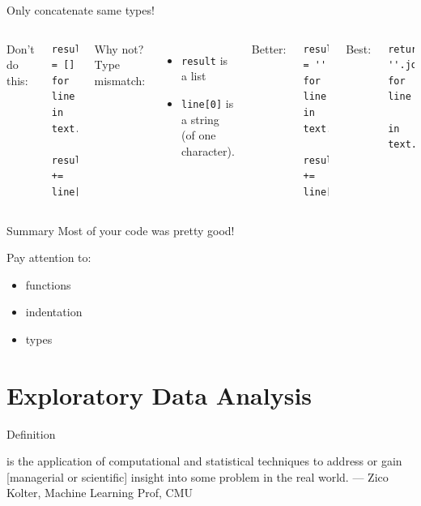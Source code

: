 \documentclass{beamer}
\begin{document}
\begin{frame}[fragile]{Only concatenate same types!}
\begin{columns}[T]
Don't do this:
\begin{lstlisting}
result = []
for line in text.splitlines():
    result += line[0]
\end{lstlisting}
Why not? Type mismatch:
    \begin{itemize}
        \item \texttt{result} is a list
        \item \texttt{line[0]} is a string \\
            (of one character).
    \end{itemize}
\pause{}
Better:
\begin{lstlisting}
result = ''
for line in text.splitlines():
    result += line[0]
\end{lstlisting}
Best:
\begin{lstlisting}
return ''.join(line[0] for line
        in text.splitlines())
\end{lstlisting}
\end{columns}
\end{frame}


\begin{frame}{Summary}
    Most of your code was pretty good!
    
    \vspace{1em}
    Pay attention to:
    \begin{itemize}
        \item functions
        \item indentation
        \item types
    \end{itemize}
\end{frame}





\section{Exploratory Data Analysis}
\frame{\tableofcontents[currentsection]}

\begin{frame}{Definition}
    \begin{definition}
     is the application of
    computational and statistical techniques to
    address or gain [managerial or scientific]
    insight into some problem in the real world.
    --- Zico Kolter, Machine Learning Prof, CMU
    \end{definition}
\end{frame}
\end{document}
